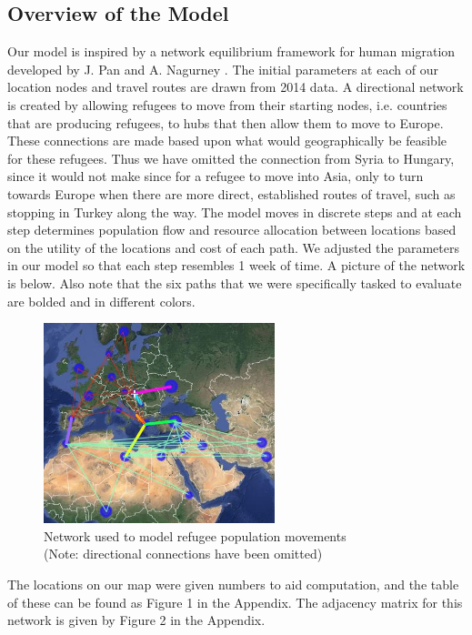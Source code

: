 \documentclass{article}
\begin{document}
\subsection{Overview of the Model}
Our model is inspired by a network equilibrium framework for human migration developed by J. Pan and A. Nagurney \cite{model1}. The initial parameters at each of our location nodes and travel routes are drawn from 2014 data. A directional network is created by allowing refugees to move from their starting nodes, i.e. countries that are producing refugees, to hubs that then allow them to move to Europe. These connections are made based upon what would geographically be feasible for these refugees. Thus we have omitted the connection from Syria to Hungary, since it would not make since for a refugee to move into Asia, only to turn towards Europe when there are more direct, established routes of travel, such as stopping in Turkey along the way. The model moves in discrete steps and at each step determines population flow and resource allocation between locations based on the utility of the locations and cost of each path. We adjusted the parameters in our model so that each step resembles 1 week of time. A picture of the network is below. Also note that the six paths that we were specifically tasked to evaluate are bolded and in different colors.

\begin{figure}[H]
    \centering
    \includegraphics[width=0.6\textwidth]{NetworkPics/fully-connected.JPG}
    \caption [width=0.8\textwidth]{\centering Network used to model refugee population movements\\ (Note: directional connections have been omitted)}
\end{figure}

The locations on our map were given numbers to aid computation, and the table of these can be found as Figure 1 in the Appendix. The adjacency matrix for this network is given by Figure 2 in the Appendix.
\end{document}
